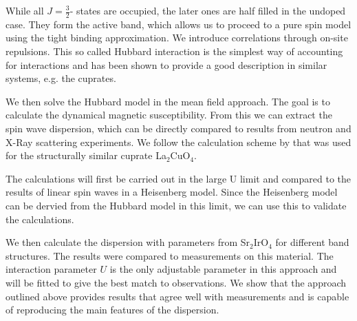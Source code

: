While all $J=\frac32$- states are occupied, the later ones are half filled in the undoped case.
They form the active band, which allows us to proceed to a pure spin model using the tight binding approximation.
We introduce  correlations through on-site repulsions. 
This so called Hubbard interaction is the simplest way of accounting for interactions 
and has been shown to provide a good description in similar systems, e.g. the cuprates.

We then solve the Hubbard model in the mean field approach.
The goal is to calculate the dynamical magnetic susceptibility.
From this we can extract the spin wave dispersion, which 
can be directly compared to results from neutron and X-Ray scattering experiments.
We follow the calculation scheme by  \citet{PhysRevB.65.132404} that was used for the structurally similar cuprate La$_2$CuO$_4$.

The calculations will first be carried out in the large U limit and compared to the results of linear spin waves in a Heisenberg model.
Since the Heisenberg model can be dervied from the Hubbard model in this limit, we can use this to validate the calculations.

We then calculate the dispersion with parameters from Sr$_2$IrO$_4$ for different band structures.
The results were compared to measurements on this material. 
The interaction parameter $U$ is the only adjustable parameter in this approach and will be fitted to give the best match to observations.
We show that the approach outlined above provides results that agree well with measurements and is capable of reproducing the main features of the dispersion.
%


